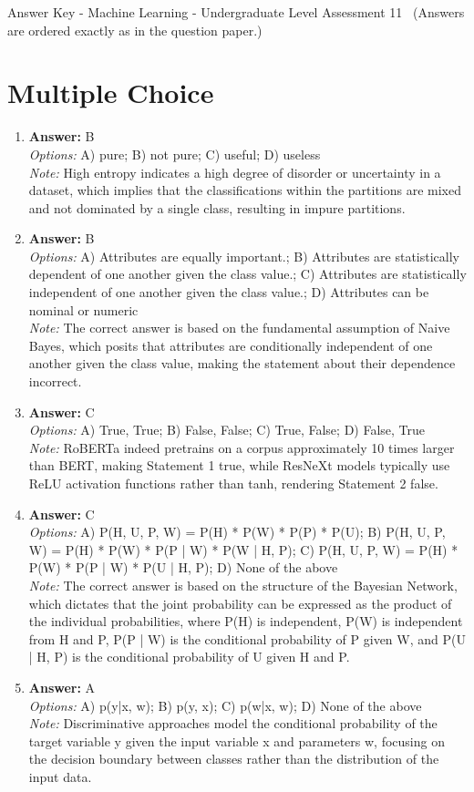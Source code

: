 \documentclass[12pt]{article}
\begin{document}
\begin{center}
Answer Key - Machine Learning - Undergraduate Level Assessment 11 \
\small (Answers are ordered exactly as in the question paper.)
\end{center}

\section*{Multiple Choice}
\begin{enumerate}[label=\arabic*.]
\item \textbf{Answer:} B
\\ \textit{Options:} A) pure; B) not pure; C) useful; D) useless
\\ \textit{Note:} High entropy indicates a high degree of disorder or uncertainty in a dataset, which implies that the classifications within the partitions are mixed and not dominated by a single class, resulting in impure partitions.
\item \textbf{Answer:} B
\\ \textit{Options:} A) Attributes are equally important.; B) Attributes are statistically dependent of one another given the class value.; C) Attributes are statistically independent of one another given the class value.; D) Attributes can be nominal or numeric
\\ \textit{Note:} The correct answer is based on the fundamental assumption of Naive Bayes, which posits that attributes are conditionally independent of one another given the class value, making the statement about their dependence incorrect.
\item \textbf{Answer:} C
\\ \textit{Options:} A) True, True; B) False, False; C) True, False; D) False, True
\\ \textit{Note:} RoBERTa indeed pretrains on a corpus approximately 10 times larger than BERT, making Statement 1 true, while ResNeXt models typically use ReLU activation functions rather than tanh, rendering Statement 2 false.
\item \textbf{Answer:} C
\\ \textit{Options:} A) P(H, U, P, W) = P(H) * P(W) * P(P) * P(U); B) P(H, U, P, W) = P(H) * P(W) * P(P | W) * P(W | H, P); C) P(H, U, P, W) = P(H) * P(W) * P(P | W) * P(U | H, P); D) None of the above
\\ \textit{Note:} The correct answer is based on the structure of the Bayesian Network, which dictates that the joint probability can be expressed as the product of the individual probabilities, where P(H) is independent, P(W) is independent from H and P, P(P | W) is the conditional probability of P given W, and P(U | H, P) is the conditional probability of U given H and P.
\item \textbf{Answer:} A
\\ \textit{Options:} A) p(y|x, w); B) p(y, x); C) p(w|x, w); D) None of the above
\\ \textit{Note:} Discriminative approaches model the conditional probability of the target variable y given the input variable x and parameters w, focusing on the decision boundary between classes rather than the distribution of the input data.
\end{enumerate}
\end{document}
